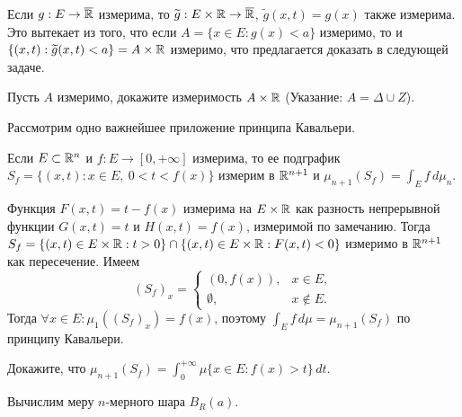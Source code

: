 \begin{note}
    Если $g : E \to \overline{\mathbb{R}}$ измерима, то $\widetilde{g} : E \times \mathbb{R} \to \overline{\mathbb{R}}$, $\widetilde{g} (x, t) = g(x)$ также измерима. Это вытекает из того, что если
    $A = \{x \in E : g(x) < a\}$ измеримо, то и $\{(x, t) : \widetilde{g}(x, t) < a\} = A \times \mathbb{R}$ измеримо, что предлагается доказать в следующей задаче.
\end{note}

\begin{problem}
    Пусть $A$ измеримо, докажите измеримость $A \times \mathbb{R}$ (Указание: $A = \Delta \cup Z$).
\end{problem}

Рассмотрим одно важнейшее приложение принципа Кавальери.

\begin{corollary}
    Если $E \subset \mathbb{R}^n$ и $f : E \to [0, +\infty]$ измерима, то ее подграфик $S_f = \{(x, t) : x \in E, \ 0 < t < f(x)\}$ измерим в $\mathbb{R}^{n+1}$ и $\mu_{n+1}(S_f) = \int_{E} f \, d\mu_n$.
\end{corollary}

\begin{myproof}
    Функция $F(x, t) = t - f(x)$ измерима на $E \times \mathbb{R}$ как разность непрерывной функции $G(x,t) = t$ и $H(x, t) = f(x)$, измеримой по замечанию. 
    Тогда $S_f = \{(x, t) \in E \times \mathbb{R} : t > 0\} \cap \{(x, t) \in E \times \mathbb{R} : F(x, t) < 0\}$ измеримо в $\mathbb{R}^{n+1}$ как пересечение.
    Имеем \[(S_f)_x = \begin{cases}
     (0, f(x)), & x \in E, \\  
     \emptyset, & x \notin E. 
    \end{cases}\]
    Тогда $\forall x \in E : \mu_1 ((S_f)_x) = f(x)$, поэтому $\int_{E} f \, d\mu = \mu_{n+1} (S_f)$ по принципу Кавальери. 
\end{myproof}

\begin{problem}
    Докажите, что $\mu_{n+1} (S_f) = \int_{0}^{+\infty} \mu \{x \in E : f(x) > t\} \, dt$.
\end{problem}

\begin{example}
    Вычислим меру $n$-мерного шара $B_R(a)$. 
\end{example}

